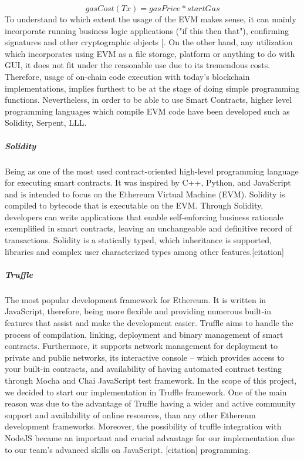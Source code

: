 				\[ gasCost(Tx)= {gasPrice *  startGas}\]
To understand to which extent the usage of the EVM makes sense, it can mainly incorporate running business logic applications ("if this then that"), confirming signatures and other cryptographic objects [\cite{Ethereum2017}. On the other hand, any utilization which incorporates using EVM as a file storage, platform or anything to do with GUI, it does not fit under the reasonable use due to its tremendous costs. Therefore, usage of on-chain code execution with today's blockchain implementations, implies furthest to be at the stage of doing simple programming functions. Nevertheless, in order to be able to use Smart Contracts, higher level programming languages which compile EVM code have been developed such as Solidity, Serpent, LLL.


\subparagraph{Solidity}
Being as one of the most used contract-oriented high-level programming language for executing smart contracts. It was inspired by C++, Python, and JavaScript and is intended to focus on the Ethereum Virtual Machine (EVM). Solidity is compiled to bytecode that is executable on the EVM. Through Solidity, developers can write applications that enable self-enforcing business rationale exemplified in smart contracts, leaving an unchangeable and definitive record of transactions. Solidity is a statically typed, which inheritance is supported, libraries and complex user characterized types among other features.[citation]

\subparagraph{Truffle}
The most popular development framework for Ethereum. It is written in JavaScript, therefore, being more flexible and providing numerous built-in features that assist and make the development easier. Truffle aims to handle the process of compilation, linking, deployment and binary management of smart contracts. Furthermore, it supports network management for deployment to private and public networks, its interactive console – which provides access to your built-in contracts, and availability of having automated contract testing through Mocha and Chai JavaScript test framework. In the scope of this project, we decided to start our implementation in Truffle framework. One of the main reason was due to the advantage of Truffle having a wider and active community support and availability of online resources, than any other Ethereum development frameworks. Moreover, the possibility of truffle integration with NodeJS became an important and crucial advantage for our implementation due to our team’s advanced skills on JavaScript. [citation] programming.

